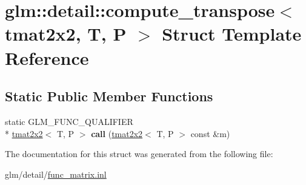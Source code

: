 \hypertarget{structglm_1_1detail_1_1compute__transpose_3_01tmat2x2_00_01T_00_01P_01_4}{\section{glm\-:\-:detail\-:\-:compute\-\_\-transpose$<$ tmat2x2, T, P $>$ Struct Template Reference}
\label{structglm_1_1detail_1_1compute__transpose_3_01tmat2x2_00_01T_00_01P_01_4}
}
\subsection*{Static Public Member Functions}
\begin{DoxyCompactItemize}
\item 
\hypertarget{structglm_1_1detail_1_1compute__transpose_3_01tmat2x2_00_01T_00_01P_01_4_a2a0e412640848cca363b201a1a988ddb}{static G\-L\-M\-\_\-\-F\-U\-N\-C\-\_\-\-Q\-U\-A\-L\-I\-F\-I\-E\-R \\*
\hyperlink{structglm_1_1tmat2x2}{tmat2x2}$<$ T, P $>$ {\bfseries call} (\hyperlink{structglm_1_1tmat2x2}{tmat2x2}$<$ T, P $>$ const \&m)}\label{structglm_1_1detail_1_1compute__transpose_3_01tmat2x2_00_01T_00_01P_01_4_a2a0e412640848cca363b201a1a988ddb}

\end{DoxyCompactItemize}


The documentation for this struct was generated from the following file\-:\begin{DoxyCompactItemize}
\item 
glm/detail/\hyperlink{func__matrix_8inl}{func\-\_\-matrix.\-inl}\end{DoxyCompactItemize}

